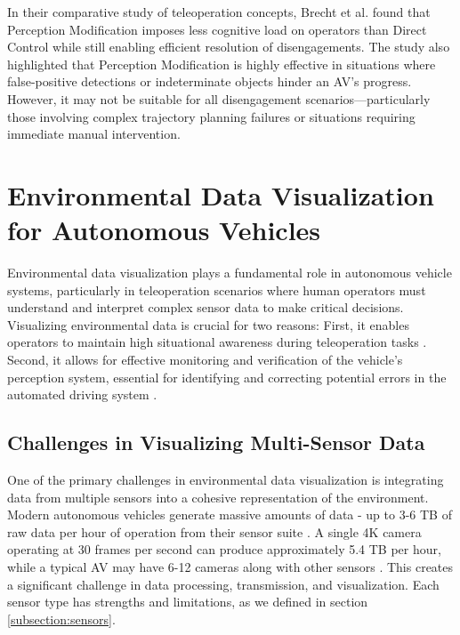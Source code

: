 In their comparative study of teleoperation concepts, Brecht et al. \cite{Brecht} found
that Perception Modification imposes less cognitive load on operators than
Direct Control while still enabling efficient resolution of disengagements.
The study also highlighted that Perception Modification is highly effective in
situations where false-positive detections or indeterminate objects hinder an AV's progress.
However, it may not be suitable for all disengagement scenarios—particularly those
involving complex trajectory planning failures or situations requiring immediate manual intervention.

\section{Environmental Data Visualization for Autonomous Vehicles}
Environmental data visualization plays a fundamental role in autonomous vehicle systems,
particularly in teleoperation scenarios where human operators must understand and interpret
complex sensor data to make critical decisions. Visualizing environmental data is crucial
for two reasons: First, it enables operators to maintain high situational awareness during
teleoperation tasks \cite{Gnatzig}. Second, it allows for effective monitoring and verification
of the vehicle's perception system, essential for identifying and correcting potential errors
in the automated driving system \cite{feiler2023perception}.

\subsection{Challenges in Visualizing Multi-Sensor Data}
One of the primary challenges in environmental data visualization is integrating data from multiple
sensors into a cohesive representation of the environment. Modern autonomous vehicles generate
massive amounts of data - up to 3-6 TB of raw data per hour of operation from their sensor suite \cite{kazhamiaka2021challenges}
. A single 4K camera operating at 30 frames per second can produce
approximately 5.4 TB per hour, while a typical AV may have 6-12 cameras along with other sensors \cite{visualcapitalist2024}
. This creates a significant challenge in data processing, transmission,
and visualization. Each sensor type has strengths and limitations, as we defined in section \ref{subsection:sensors}.

